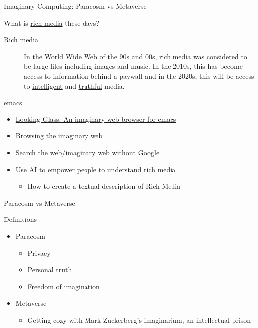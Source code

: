 \documentclass[presentation]{beamer}
\begin{document}
\begin{frame}[label={sec:orgc50d365}]{Imaginary Computing: Paracosm vs Metaverse}
\begin{block}{What is \uline{rich media} these days?}
\begin{description}
\item[{Rich media}] In the World Wide Web of the 90s and 00s, \uline{rich media}
was considered to be large files including
images and music. In the 2010s, this has become
access to information behind a paywall and in
the 2020s, this will be access to \uline{intelligent}
and \uline{truthful} media.
\end{description}
\end{block}

\begin{block}{emacs}
\begin{itemize}
\item \href{https://semiosis.github.io/looking-glass/}{Looking-Glass: An imaginary-web browser for emacs}
\item \href{https://mullikine.github.io/posts/the-imaginary-web-with-codex/}{Browsing the imaginary web}
\item \href{https://mullikine.github.io/posts/search-the-web-with-codex/}{Search the web/imaginary web without Google}
\item \href{https://mullikine.github.io/posts/alephalpha-for-alttext/}{Use AI to empower people to understand rich media}
\begin{itemize}
\item How to create a textual description of Rich Media
\end{itemize}
\end{itemize}
\end{block}
\end{frame}

\begin{frame}[label={sec:org1aa5acd}]{Paracosm vs Metaverse}
\begin{block}{Definitions}
\begin{itemize}
\item Paracosm
\begin{itemize}
\item Privacy
\item Personal truth
\item Freedom of imagination
\end{itemize}
\item Metaverse
\begin{itemize}
\item Getting cozy with Mark Zuckerberg's imaginarium, an intellectual prison
\end{itemize}
\end{itemize}
\end{block}
\end{frame}
\end{document}
